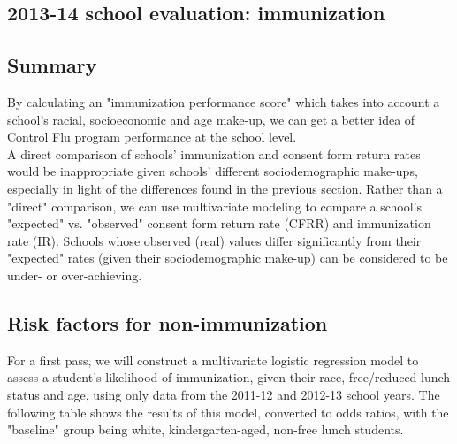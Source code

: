 \documentclass{article}
\begin{document}
\begin{multicols}{2}
\begin{multicols}{2}
\end{multicols}
\begin{center}
\section*{2013-14 school evaluation: immunization}
\end{center}
\begin{multicols}{2}


\subsection*{Summary}
By calculating an "immunization performance score" which takes into account a school's racial, socioeconomic and age make-up, we can get a better idea of Control Flu program performance at the school level. \\



A direct comparison of schools' immunization and consent form return rates would be inappropriate given schools' different sociodemographic make-ups, especially in light of the differences found in the previous section.  Rather than a "direct" comparison, we can use multivariate modeling to compare a school's "expected" vs. "observed" consent form return rate (CFRR) and immunization rate (IR).  Schools whose observed (real) values differ significantly from their "expected" rates (given their sociodemographic make-up) can be considered to be under- or over-achieving.  \\

\subsection*{Risk factors for non-immunization}


For a first pass, we will construct a multivariate logistic regression model to assess a student's likelihood of immunization, given their race, free/reduced lunch status and age, using only data from the 2011-12 and 2012-13 school years.  The following table shows the results of this model, converted to odds ratios, with the "baseline" group being white, kindergarten-aged, non-free lunch students. \\ 



\end{multicols}
\end{multicols}
\end{document}
